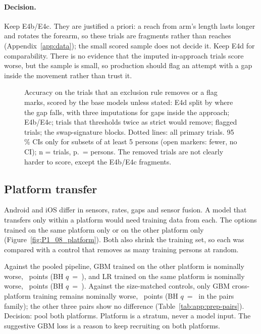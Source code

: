 \paragraph{Decision.} Keep E4b/E4c. They are justified a priori: a reach from arm's length lasts longer and
rotates the forearm, so these trials are fragments rather than reaches (Appendix~\ref{app:data}); the small
scored sample does not decide it. Keep E4d for comparability. There is no evidence that the imputed
in-approach trials score worse, but the sample is small, so production should flag an attempt with a gap
inside the movement rather than trust it.

\begin{figure}[htbp]
\centering
{}
\caption{Accuracy on the trials that an exclusion rule removes or a flag marks, scored by the base models
unless stated: E4d split by where the gap falls, with three imputations for gaps inside the approach;
E4b/E4c; trials that thresholds twice as strict would remove; flagged trials; the swap-signature blocks.
Dotted lines: all primary trials. 95\,\% CIs only for subsets of at least 5 persons (open markers: fewer, no
CI); n = trials, p.\ = persons. The removed trials are not clearly harder to score, except the E4b/E4c
fragments.}
\label{fig:P1_09_exclusions}\label{fig:app:prep-exclusions}
\end{figure}

\subsection{Platform transfer}\label{app:prep:platform}

Android and iOS differ in sensors, rates, gaps and sensor fusion. A model that transfers only within a
platform would need training data from each. The options trained on the same platform only or on the other
platform only (Figure~\ref{fig:P1_08_platform}). Both also shrink the training set, so each was compared
with a control that removes as many training persons at random.

Against the pooled pipeline, GBM trained on the other platform is nominally worse,
~points (BH $q$~=~), and LR trained on the same
platform is nominally worse, ~points (BH $q$~=~).
Against the size-matched controls, only GBM cross-platform training remains nominally worse,
~points (BH $q$~=~ in the pairs family);
the other three pairs show no difference (Table~\ref{tab:app:prep-pairs}). Decision: pool both platforms.
Platform is a stratum, never a model input. The suggestive GBM loss is a reason to keep recruiting on both
platforms.

